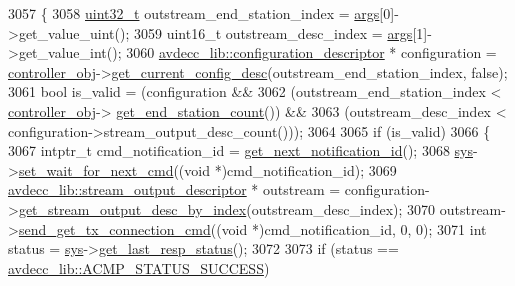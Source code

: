 \begin{DoxyCode}
3057 \{
3058     \hyperlink{parse_8c_a6eb1e68cc391dd753bc8ce896dbb8315}{uint32\_t} outstream\_end\_station\_index = \hyperlink{namespaceastime__fitline_a8187411843a6284ffb964ef3fb9fcab3}{args}[0]->get\_value\_uint();
3059     uint16\_t outstream\_desc\_index = \hyperlink{namespaceastime__fitline_a8187411843a6284ffb964ef3fb9fcab3}{args}[1]->get\_value\_int();
3060     \hyperlink{classavdecc__lib_1_1configuration__descriptor}{avdecc\_lib::configuration\_descriptor} * configuration = 
      \hyperlink{classcmd__line_af0a7784509e5bf1210a2aa19cea5df70}{controller\_obj}->\hyperlink{classavdecc__lib_1_1controller_af249ed146464b54d7fc9d87f67bcff46}{get\_current\_config\_desc}(outstream\_end\_station\_index, \textcolor{keyword}{
      false});
3061     \textcolor{keywordtype}{bool} is\_valid = (configuration &&
3062                      (outstream\_end\_station\_index < \hyperlink{classcmd__line_af0a7784509e5bf1210a2aa19cea5df70}{controller\_obj}->
      \hyperlink{classavdecc__lib_1_1controller_ab5ddf7b4a9718fe3e821289141f44485}{get\_end\_station\_count}()) &&
3063                      (outstream\_desc\_index < configuration->stream\_output\_desc\_count()));
3064 
3065     \textcolor{keywordflow}{if} (is\_valid)
3066     \{
3067         intptr\_t cmd\_notification\_id = \hyperlink{classcmd__line_a57486218387d1aa9d262eb7c176154ad}{get\_next\_notification\_id}();
3068         \hyperlink{classcmd__line_a485db4800e331cb4052c447fdf5d154e}{sys}->\hyperlink{classavdecc__lib_1_1system_a26b769584f10225077da47583edda33e}{set\_wait\_for\_next\_cmd}((\textcolor{keywordtype}{void} *)cmd\_notification\_id);
3069         \hyperlink{classavdecc__lib_1_1stream__output__descriptor}{avdecc\_lib::stream\_output\_descriptor} * outstream = 
      configuration->\hyperlink{classavdecc__lib_1_1configuration__descriptor_a300ea5957342e2e9579318135da02856}{get\_stream\_output\_desc\_by\_index}(outstream\_desc\_index);
3070         outstream->\hyperlink{classavdecc__lib_1_1stream__output__descriptor_a90b93e5bd071ce7b57fa1dfd57b6d183}{send\_get\_tx\_connection\_cmd}((\textcolor{keywordtype}{void} *)cmd\_notification\_id, 0, 0);
3071         \textcolor{keywordtype}{int} status = \hyperlink{classcmd__line_a485db4800e331cb4052c447fdf5d154e}{sys}->\hyperlink{classavdecc__lib_1_1system_aa63e8d1a4e51f695cdcccc9340922407}{get\_last\_resp\_status}();
3072 
3073         \textcolor{keywordflow}{if} (status == \hyperlink{namespaceavdecc__lib_ae0a51eed2d4dfed01460049a240d6f34a6e7347496acf3a05a9b3dab05deb8765}{avdecc\_lib::ACMP\_STATUS\_SUCCESS})

\end{DoxyCode}
